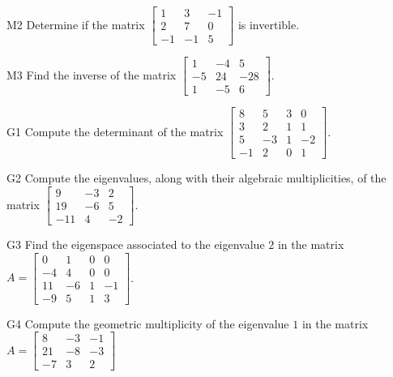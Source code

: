 \documentclass{sbgLAsemi}
\begin{document}
\begin{problem}{M2} Determine if the matrix $\begin{bmatrix} 1 & 3 & -1 \\ 2 & 7 & 0 \\ -1 & -1 & 5 \end{bmatrix}$ is invertible.
\end{problem}

\begin{problem}{M3}
  Find the inverse of the matrix
  \(\begin{bmatrix}
    1 & -4 & 5  \\
    -5 & 24 & -28  \\
    1 & -5 & 6
  \end{bmatrix}\).
\end{problem}

\begin{problem}{G1}
Compute the determinant of the matrix $\begin{bmatrix} 8 & 5 & 3 & 0 \\ 3 & 2 & 1 & 1 \\ 5 & -3 & 1 & -2 \\ -1 & 2 & 0 & 1\end{bmatrix} $.
\end{problem}

\begin{problem}{G2}
Compute the eigenvalues, along with their algebraic multiplicities, of the matrix $ \begin{bmatrix} 9 & -3 & 2 \\ 19 & -6 & 5 \\ -11 & 4 & -2\end{bmatrix}$.
\end{problem}

\begin{problem}{G3}
Find the eigenspace associated to the eigenvalue $2$ in the matrix $A=\begin{bmatrix} 0 & 1 & 0 & 0 \\ -4 & 4 & 0 & 0 \\ 11 & -6 & 1 & -1 \\ -9 & 5 & 1 & 3 \end{bmatrix}$.
\end{problem}

\begin{problem}{G4}
Compute the geometric multiplicity of the eigenvalue $1$ in the matrix $A=\begin{bmatrix} 8 & -3 & -1 \\ 21 & -8 & -3 \\ -7 & 3  & 2 \end{bmatrix}$
\end{problem}
\end{document}
